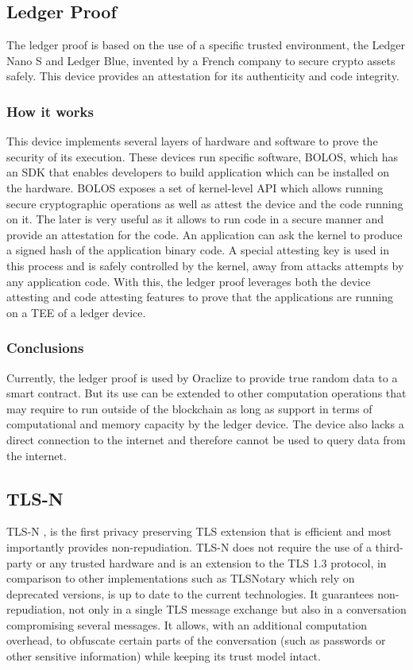 \subsection{Ledger Proof}

The ledger proof is based on the use of a specific trusted environment, the Ledger Nano S and Ledger Blue, invented by a French company to secure crypto assets safely. This device provides an attestation for its authenticity and code integrity.

\subsubsection{How it works}

This device implements several layers of hardware and software to prove the security of its execution. These devices run specific software, BOLOS, which has an SDK that enables developers to build application which can be installed on the hardware. BOLOS exposes a set of kernel-level API which allows running secure cryptographic operations as well as attest the device and the code running on it. The later is very useful as it allows to run code in a secure manner and provide an attestation for the code. An application can ask the kernel to produce a signed hash of the application binary code. A special attesting key is used in this process and is safely controlled by the kernel, away from attacks attempts by any application code. With this, the ledger proof leverages both the device attesting and code attesting features to prove that the applications are running on a TEE of a ledger device.

\subsubsection{Conclusions}

Currently, the ledger proof is used by Oraclize to provide true random data to a smart contract. But its use can be extended to other computation operations that may require to run outside of the blockchain as long as support in terms of computational and memory capacity by the ledger device. The device also lacks a direct connection to the internet and therefore cannot be used to query data from the internet.


\subsection{TLS-N}
TLS-N \cite{Ritzdorf2017}, is the first privacy preserving TLS extension that is efficient and most importantly provides non-repudiation. TLS-N does not require the use of a third-party or any trusted hardware and is an extension to the TLS 1.3 protocol, in comparison to other implementations such as TLSNotary which rely on deprecated versions, is up to date to the current technologies.
It guarantees non-repudiation, not only in a single TLS message exchange but also in a conversation compromising several messages. It allows, with an additional computation overhead, to obfuscate certain parts of the conversation (such as passwords or other sensitive information) while keeping its trust model intact.

